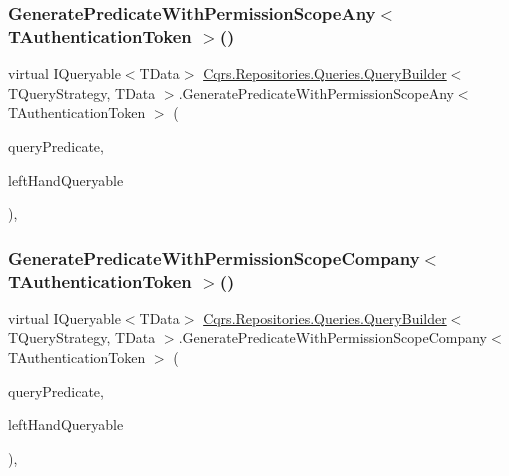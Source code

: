 \subsubsection{\texorpdfstring{Generate\+Predicate\+With\+Permission\+Scope\+Any$<$ T\+Authentication\+Token $>$()}{GeneratePredicateWithPermissionScopeAny< TAuthenticationToken >()}}
{\footnotesize\ttfamily virtual I\+Queryable$<$T\+Data$>$ \hyperlink{classCqrs_1_1Repositories_1_1Queries_1_1QueryBuilder}{Cqrs.\+Repositories.\+Queries.\+Query\+Builder}$<$ T\+Query\+Strategy, T\+Data $>$.Generate\+Predicate\+With\+Permission\+Scope\+Any$<$ T\+Authentication\+Token $>$ (\begin{DoxyParamCaption}\item[{\hyperlink{classCqrs_1_1Repositories_1_1Queries_1_1QueryPredicate}{Query\+Predicate}}]{query\+Predicate,  }\item[{I\+Queryable$<$ T\+Data $>$}]{left\+Hand\+Queryable }\end{DoxyParamCaption})\hspace{0.3cm}{\ttfamily [protected]}, {\ttfamily [virtual]}}

\mbox{\label{classCqrs_1_1Repositories_1_1Queries_1_1QueryBuilder_aa1341909b87629158efa619af12cec5f}} 
\subsubsection{\texorpdfstring{Generate\+Predicate\+With\+Permission\+Scope\+Company$<$ T\+Authentication\+Token $>$()}{GeneratePredicateWithPermissionScopeCompany< TAuthenticationToken >()}}
{\footnotesize\ttfamily virtual I\+Queryable$<$T\+Data$>$ \hyperlink{classCqrs_1_1Repositories_1_1Queries_1_1QueryBuilder}{Cqrs.\+Repositories.\+Queries.\+Query\+Builder}$<$ T\+Query\+Strategy, T\+Data $>$.Generate\+Predicate\+With\+Permission\+Scope\+Company$<$ T\+Authentication\+Token $>$ (\begin{DoxyParamCaption}\item[{\hyperlink{classCqrs_1_1Repositories_1_1Queries_1_1QueryPredicate}{Query\+Predicate}}]{query\+Predicate,  }\item[{I\+Queryable$<$ T\+Data $>$}]{left\+Hand\+Queryable }\end{DoxyParamCaption})\hspace{0.3cm}{\ttfamily [protected]}, {\ttfamily [virtual]}}

